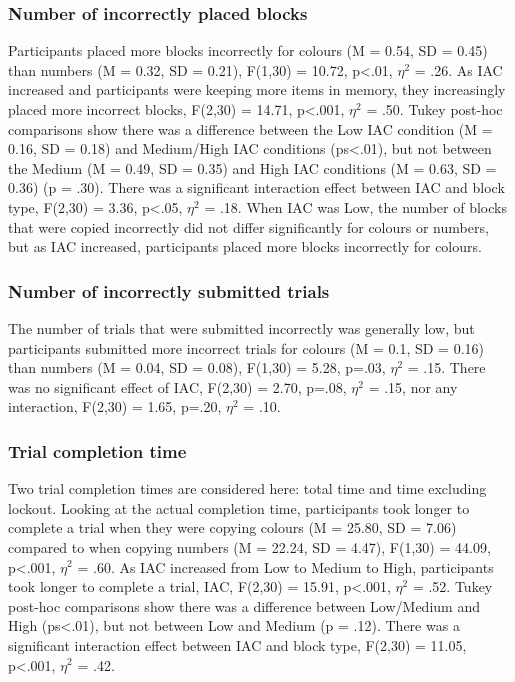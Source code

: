 \subsubsection{Number of incorrectly placed blocks}
Participants placed more blocks incorrectly for colours (M = 0.54, SD = 0.45) than numbers (M = 0.32, SD = 0.21), F(1,30) = 10.72, p<.01, $\eta^2$ = .26. %
As IAC increased and participants were keeping more items in memory, they increasingly placed more incorrect blocks, F(2,30) = 14.71, p<.001, $\eta^2$ = .50. Tukey post-hoc comparisons show there was a difference between the Low IAC condition (M = 0.16, SD = 0.18) and Medium/High IAC conditions (ps<.01), but not between the Medium (M = 0.49, SD = 0.35) and High IAC conditions (M = 0.63, SD = 0.36) (p = .30). There was a significant interaction effect between IAC and block type, F(2,30) = 3.36, p<.05, $\eta^2$ = .18. When IAC was Low, the number of blocks that were copied incorrectly did not differ significantly for colours or numbers, but as IAC increased, participants placed more blocks incorrectly for colours.

\subsubsection{Number of incorrectly submitted trials}
The number of trials that were submitted incorrectly was generally low, but participants submitted more incorrect trials for colours (M = 0.1, SD = 0.16) than numbers (M = 0.04, SD = 0.08), F(1,30) = 5.28, p=.03, $\eta^2$ = .15. There was no significant effect of IAC, F(2,30) = 2.70, p=.08, $\eta^2$ = .15, nor any interaction, F(2,30) = 1.65, p=.20, $\eta^2$ = .10.

\subsubsection{Trial completion time}
Two trial completion times are considered here: total time and time excluding lockout. 
Looking at the actual completion time, participants took longer to complete a trial when they were copying colours (M = 25.80, SD = 7.06) compared to when copying numbers (M = 22.24, SD = 4.47), F(1,30) = 44.09, p<.001, $\eta^2$ = .60. As IAC increased from Low to Medium to High, participants took longer to complete a trial, IAC, F(2,30) = 15.91, p<.001, $\eta^2$ = .52. Tukey post-hoc comparisons show there was a difference between Low/Medium and High (ps<.01), but not between Low and Medium (p = .12). There was a significant interaction effect between IAC and block type, F(2,30) = 11.05, p<.001, $\eta^2$ = .42. 

